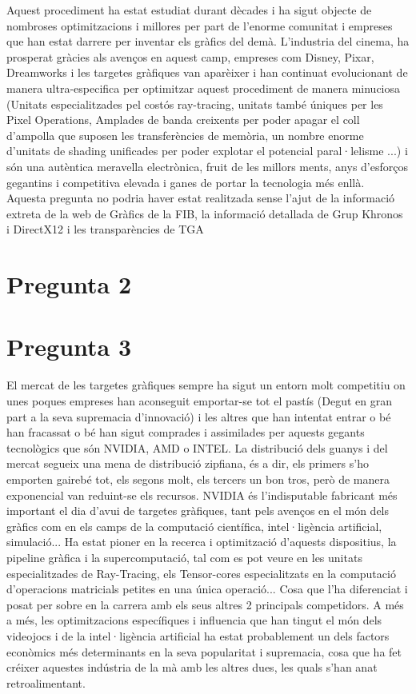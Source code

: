 \documentclass[12pt]{article}
\begin{document}
Aquest procediment ha estat estudiat durant dècades i ha sigut objecte de nombroses optimitzacions i millores per part de l'enorme comunitat i empreses que han estat darrere per inventar els gràfics 
del demà. L'industria del cinema, ha prosperat gràcies als avenços en aquest camp, empreses com Disney, Pixar, Dreamworks i les targetes gràfiques van aparèixer i han continuat evolucionant de manera ultra-especifica 
 per optimitzar aquest procediment de manera minuciosa (Unitats especialitzades pel costós ray-tracing, unitats també úniques per les Pixel Operations, Amplades de banda creixents per poder apagar el coll d'ampolla que suposen 
les transferències de memòria, un nombre enorme d'unitats de shading unificades per poder explotar el potencial paral·lelisme ...) i són una autèntica meravella electrònica, fruit de les millors ments, anys d'esforços gegantins i
competitiva elevada i ganes de portar la tecnologia més enllà.
\\ 

Aquesta pregunta no podria haver estat realitzada sense l'ajut de la informació extreta de la web de Gràfics de la FIB\cite{cs_upc_virtual}, la informació detallada de Grup Khronos\cite{khronos_opengl} i DirectX12\cite{microsoft_directx12} i les transparències de TGA\cite{graphics_cards_slides}

\section{Pregunta 2}

\section{Pregunta 3}
El mercat de les targetes gràfiques sempre ha sigut un entorn molt competitiu on unes poques empreses han aconseguit emportar-se tot el pastís (Degut en gran part a la seva supremacia d'innovació) i les altres que han intentat entrar
 o bé han fracassat o bé han sigut comprades i assimilades per aquests gegants tecnològics que són NVIDIA, AMD o INTEL. La distribució dels guanys i del mercat segueix una mena de distribució zipfiana, és a dir, els primers s'ho emporten 
gairebé tot, els segons molt, els tercers un bon tros, però de manera exponencial van reduint-se els recursos. NVIDIA és l'indisputable fabricant més important el dia d'avui de targetes gràfiques, tant pels avenços en el món dels gràfics 
com en els camps de la computació científica, intel·ligència artificial, simulació... Ha estat pioner en la recerca i optimització d'aquests dispositius, la pipeline gràfica i la supercomputació, tal com es pot veure en les 
unitats especialitzades de Ray-Tracing, els Tensor-cores especialitzats en la computació d'operacions matricials petites en una única operació... Cosa que l'ha diferenciat i posat per sobre en la carrera amb els seus altres 2 
principals competidors. A més a més, les optimitzacions específiques i influencia que han tingut el món dels videojocs i de la intel·ligència artificial ha estat probablement un dels factors econòmics més determinants en la seva popularitat i supremacia, cosa que ha fet créixer aquestes 
indústria de la mà amb les altres dues, les quals s'han anat retroalimentant.
\\
\end{document}
